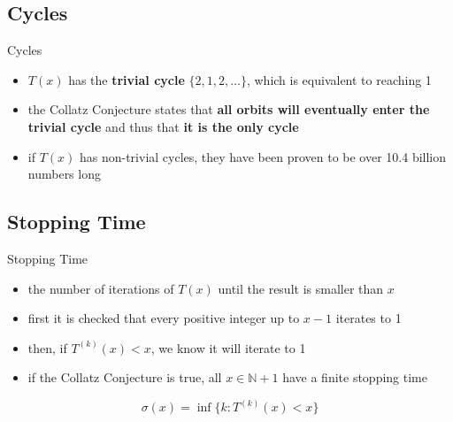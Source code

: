 \documentclass[hyperref={colorlinks,allcolors=black}]{beamer}
\begin{document}
\subsection{Cycles}


\begin{frame}{Cycles}
\begin{itemize}
    \item $T(x)$ has the \textbf{trivial cycle} $\{2,1,2,\dots\}$, which is
        equivalent to reaching 1 \cite{src:chamberland}
    \item the Collatz Conjecture states that \textbf{all orbits will 
        eventually enter the trivial cycle} and thus that \textbf{it is the 
        only cycle} \cite{src:chamberland}
    \item if $T(x)$ has non-trivial cycles, they have been proven to be over
        10.4 billion numbers long \cite{src:lagarias}
\end{itemize}
\end{frame}


\subsection{Stopping Time}


\begin{frame}{Stopping Time}
\begin{itemize}
    \item the number of iterations of $T(x)$ until the result is smaller
        than $x$
    \item first it is checked that every positive integer up to $x - 1$ 
        iterates to 1
    \item then, if $T^{(k)}(x) < x$, we know it will iterate to 1
    \item if the Collatz Conjecture is true, all $x \in \mathbb{N} + 1$ have
        a finite stopping time \cite{src:chamberland}
\end{itemize}
\begin{equation}
    \nonumber
    \sigma(x)=\inf\{k:T^{(k)}(x) < x\}
\end{equation}
\end{frame}
\end{document}
